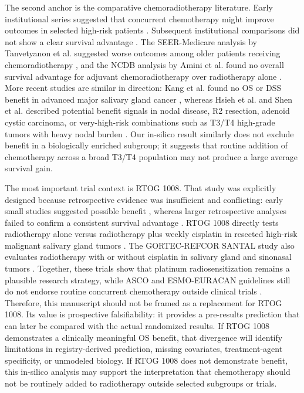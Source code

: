 \documentclass[10pt,twocolumn]{article}
\begin{document}
The second anchor is the comparative chemoradiotherapy literature. Early institutional series suggested that concurrent chemotherapy might improve outcomes in selected high-risk patients \cite{ref11,ref12}. Subsequent institutional comparisons did not show a clear survival advantage \cite{ref13,ref16}. The SEER-Medicare analysis by Tanvetyanon et al. suggested worse outcomes among older patients receiving chemoradiotherapy \cite{ref14}, and the NCDB analysis by Amini et al. found no overall survival advantage for adjuvant chemoradiotherapy over radiotherapy alone \cite{ref15}. More recent studies are similar in direction: Kang et al. found no OS or DSS benefit in advanced major salivary gland cancer \cite{ref19}, whereas Hsieh et al. and Shen et al. described potential benefit signals in nodal disease, R2 resection, adenoid cystic carcinoma, or very-high-risk combinations such as T3/T4 high-grade tumors with heavy nodal burden \cite{ref20,ref21}. Our in-silico result similarly does not exclude benefit in a biologically enriched subgroup; it suggests that routine addition of chemotherapy across a broad T3/T4 population may not produce a large average survival gain.


The most important trial context is RTOG 1008. That study was explicitly designed because retrospective evidence was insufficient and conflicting: early small studies suggested possible benefit \cite{ref11,ref12}, whereas larger retrospective analyses failed to confirm a consistent survival advantage \cite{ref14,ref15}. RTOG 1008 directly tests radiotherapy alone versus radiotherapy plus weekly cisplatin in resected high-risk malignant salivary gland tumors \cite{ref22,ref23,ref24}. The GORTEC-REFCOR SANTAL study also evaluates radiotherapy with or without cisplatin in salivary gland and sinonasal tumors \cite{ref32}. Together, these trials show that platinum radiosensitization remains a plausible research strategy, while ASCO and ESMO-EURACAN guidelines still do not endorse routine concurrent chemotherapy outside clinical trials \cite{ref1,ref2}. Therefore, this manuscript should not be framed as a replacement for RTOG 1008. Its value is prospective falsifiability: it provides a pre-results prediction that can later be compared with the actual randomized results. If RTOG 1008 demonstrates a clinically meaningful OS benefit, that divergence will identify limitations in registry-derived prediction, missing covariates, treatment-agent specificity, or unmodeled biology. If RTOG 1008 does not demonstrate benefit, this in-silico analysis may support the interpretation that chemotherapy should not be routinely added to radiotherapy outside selected subgroups or trials.
\end{document}
